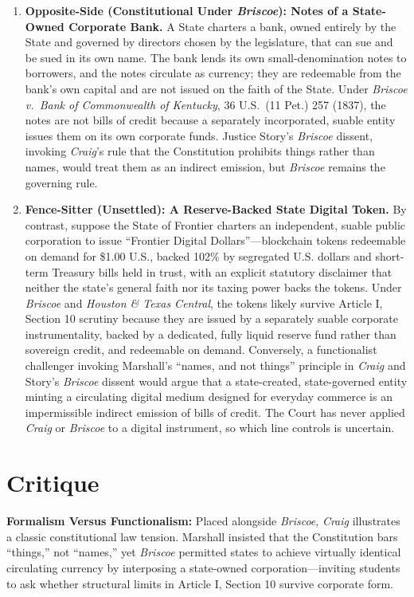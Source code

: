 \documentclass[12pt]{article}
\begin{document}
\begin{enumerate}
\item \textbf{Opposite-Side (Constitutional Under \textit{Briscoe}): Notes of a State-Owned Corporate Bank.} A State charters a bank, owned entirely by the State and governed by directors chosen by the legislature, that can sue and be sued in its own name. The bank lends its own small-denomination notes to borrowers, and the notes circulate as currency; they are redeemable from the bank's own capital and are not issued on the faith of the State. Under \textit{Briscoe v.\ Bank of Commonwealth of Kentucky}, 36 U.S.\ (11 Pet.) 257 (1837), the notes are not bills of credit because a separately incorporated, suable entity issues them on its own corporate funds. Justice Story's \textit{Briscoe} dissent, invoking \textit{Craig}'s rule that the Constitution prohibits things rather than names, would treat them as an indirect emission, but \textit{Briscoe} remains the governing rule.

\item \textbf{Fence-Sitter (Unsettled): A Reserve-Backed State Digital Token.} By contrast, suppose the State of Frontier charters an independent, suable public corporation to issue ``Frontier Digital Dollars''---blockchain tokens redeemable on demand for \$1.00 U.S., backed 102\% by segregated U.S. dollars and short-term Treasury bills held in trust, with an explicit statutory disclaimer that neither the state's general faith nor its taxing power backs the tokens. Under \textit{Briscoe} and \textit{Houston \& Texas Central}, the tokens likely survive Article I, Section 10 scrutiny because they are issued by a separately suable corporate instrumentality, backed by a dedicated, fully liquid reserve fund rather than sovereign credit, and redeemable on demand. Conversely, a functionalist challenger invoking Marshall's ``names, and not things'' principle in \textit{Craig} and Story's \textit{Briscoe} dissent would argue that a state-created, state-governed entity minting a circulating digital medium designed for everyday commerce is an impermissible indirect emission of bills of credit. The Court has never applied \textit{Craig} or \textit{Briscoe} to a digital instrument, so which line controls is uncertain.

\end{enumerate}

\section{Critique}
\textbf{Formalism Versus Functionalism:} Placed alongside \textit{Briscoe}, \textit{Craig} illustrates a classic constitutional law tension. Marshall insisted that the Constitution bars ``things,'' not ``names,'' yet \textit{Briscoe} permitted states to achieve virtually identical circulating currency by interposing a state-owned corporation---inviting students to ask whether structural limits in Article I, Section 10 survive corporate form.
\end{document}
